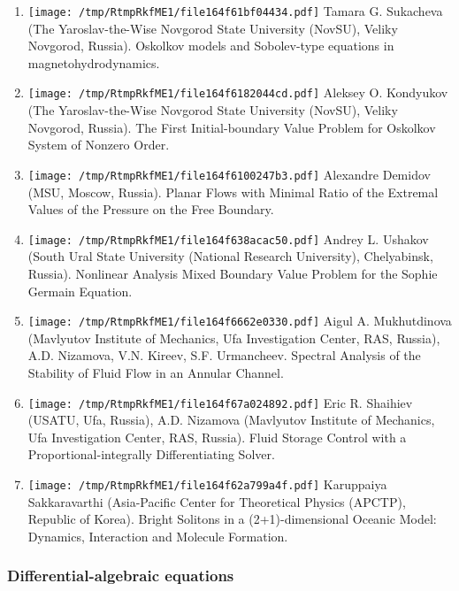 \documentclass[
]{article}
\providecommand{\tightlist}{%
  \setlength{\itemsep}{0pt}\setlength{\parskip}{0pt}}
\begin{document}
\begin{enumerate}
\def\labelenumi{\arabic{enumi}.}
\tightlist
\item
  \protect\texttt{[image: /tmp/RtmpRkfME1/file164f61bf04434.pdf]}
  Tamara G. Sukacheva (The Yaroslav-the-Wise Novgorod State University
  (NovSU), Veliky Novgorod, Russia). Oskolkov models and Sobolev-type
  equations in magnetohydrodynamics.
\item
  \protect\texttt{[image: /tmp/RtmpRkfME1/file164f6182044cd.pdf]}
  Aleksey O. Kondyukov (The Yaroslav-the-Wise Novgorod State University
  (NovSU), Veliky Novgorod, Russia). The First Initial-boundary Value
  Problem for Oskolkov System of Nonzero Order.
\item
  \protect\texttt{[image: /tmp/RtmpRkfME1/file164f6100247b3.pdf]}
  Alexandre Demidov (MSU, Moscow, Russia). Planar Flows with Minimal
  Ratio of the Extremal Values of the Pressure on the Free Boundary.
\item
  \protect\texttt{[image: /tmp/RtmpRkfME1/file164f638acac50.pdf]}
  Andrey L. Ushakov (South Ural State University (National Research
  University), Chelyabinsk, Russia). Nonlinear Analysis Mixed Boundary
  Value Problem for the Sophie Germain Equation.
\item
  \protect\texttt{[image: /tmp/RtmpRkfME1/file164f6662e0330.pdf]}
  Aigul A. Mukhutdinova (Mavlyutov Institute of Mechanics, Ufa
  Investigation Center, RAS, Russia), A.D. Nizamova, V.N. Kireev, S.F.
  Urmancheev. Spectral Analysis of the Stability of Fluid Flow in an
  Annular Channel.
\item
  \protect\texttt{[image: /tmp/RtmpRkfME1/file164f67a024892.pdf]}
  Eric R. Shaihiev (USATU, Ufa, Russia), A.D. Nizamova (Mavlyutov
  Institute of Mechanics, Ufa Investigation Center, RAS, Russia). Fluid
  Storage Control with a Proportional-integrally Differentiating Solver.
\item
  \protect\texttt{[image: /tmp/RtmpRkfME1/file164f62a799a4f.pdf]}
  Karuppaiya Sakkaravarthi (Asia-Pacific Center for Theoretical Physics
  (APCTP), Republic of Korea). Bright Solitons in a (2+1)-dimensional
  Oceanic Model: Dynamics, Interaction and Molecule Formation.
\end{enumerate}

\hypertarget{dae}{%
\subsubsection{Differential-algebraic equations}\label{dae}}
\end{document}
